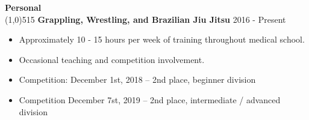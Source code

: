 \documentclass{article}
\newcommand{\s}[1]{\vspace{4mm} \noindent \large \textbf{#1} \\[-2.5mm] \linethickness{0.2mm} \line(1,0){515}}
\newcommand{\nl}{\noindent \normalsize}
\begin{document}
\s{Personal}
	\vspace{2.0mm}
	\nl \textbf{Grappling, Wrestling, and Brazilian Jiu Jitsu} \hfill 2016 - Present
		\begin{itemize}
			\item Approximately 10 - 15 hours per week of training throughout medical school.
			\vspace{-2.5mm} \item Occasional teaching and competition involvement. 
			\vspace{-2.5mm} \item Competition: December 1st, 2018 -- 2nd place, beginner division
			\vspace{-2.5mm} \item Competition December 7st, 2019 -- 2nd place, intermediate / advanced division
		\end{itemize}
\end{document}
